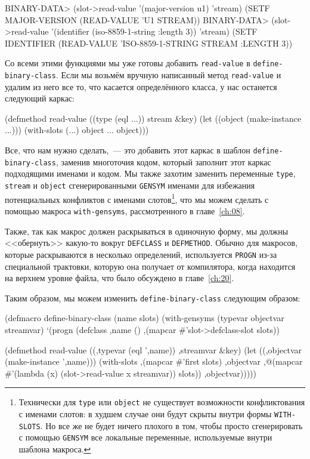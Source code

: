\begin{myverb}
BINARY-DATA> (slot->read-value '(major-version u1) 'stream)
(SETF MAJOR-VERSION (READ-VALUE 'U1 STREAM))
BINARY-DATA> (slot->read-value '(identifier (iso-8859-1-string :length 3)) 'stream)
(SETF IDENTIFIER (READ-VALUE 'ISO-8859-1-STRING STREAM :LENGTH 3))
\end{myverb}

Со всеми этими функциями мы уже готовы добавить \lstinline{read-value} в
\lstinline{define-binary-class}. Если мы возьмём вручную написанный метод \lstinline{read-value} и
удалим из него все то, что касается определённого класса, у нас останется следующий
каркас:

\begin{myverb}
(defmethod read-value ((type (eql ...)) stream &key)
  (let ((object (make-instance ...)))
    (with-slots (...) object
      ...
    object)))
\end{myverb}

Все, что нам нужно сделать,~--- это добавить этот каркас в шаблон \lstinline{define-binary-class},
заменив многоточия кодом, который заполнит этот каркас подходящими именами и кодом. Мы
также захотим заменить переменные \lstinline{type}, \lstinline{stream} и \lstinline{object}
сгенерированными \lstinline{GENSYM} именами для избежания потенциальных конфликтов с именами
слотов\footnote{Технически для \lstinline{type} или \lstinline{object} не существует возможности
  конфликтования с именами слотов: в худшем случае они будут скрыты внутри формы
  \lstinline{WITH-SLOTS}. Но все же не будет ничего плохого в том, чтобы просто
  сгенерировать с помощью \lstinline{GENSYM} все локальные переменные, используемые внутри
  шаблона макроса.}, что мы можем сделать с помощью макроса \lstinline{with-gensyms},
рассмотренного в главе~\ref{ch:08}.

Также, так как макрос должен раскрываться в одиночную форму, мы должны <<обернуть>>
какую-то вокруг \lstinline{DEFCLASS} и \lstinline{DEFMETHOD}. Обычно для макросов, которые
раскрываются в несколько определений, используется \lstinline{PROGN} из-за спе\-циаль\-ной
трактовки, которую она получает от компилятора, когда находится на верхнем уровне файла,
что было обсуждено в главе~\ref{ch:20}.

Таким образом, мы можем изменить \lstinline{define-binary-class} следующим образом:

\begin{myverb}
(defmacro define-binary-class (name slots)
  (with-gensyms (typevar objectvar streamvar)
    `(progn
       (defclass ,name ()
         ,(mapcar #'slot->defclass-slot slots))

       (defmethod read-value ((,typevar (eql ',name)) ,streamvar &key)
         (let ((,objectvar (make-instance ',name)))
           (with-slots ,(mapcar #'first slots) ,objectvar
             ,@(mapcar #'(lambda (x) (slot->read-value x streamvar)) slots))
           ,objectvar)))))
\end{myverb}

